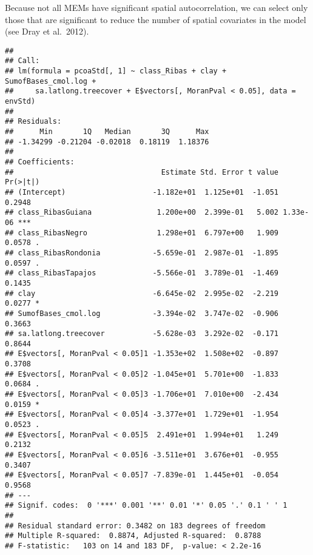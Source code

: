 \documentclass[]{article}
\newenvironment{Shaded}{\begin{snugshade}}{\end{snugshade}}
\newcommand{\CommentTok}[1]{\textcolor[rgb]{0.56,0.35,0.01}{\textit{#1}}}
\newcommand{\DataTypeTok}[1]{\textcolor[rgb]{0.13,0.29,0.53}{#1}}
\newcommand{\DecValTok}[1]{\textcolor[rgb]{0.00,0.00,0.81}{#1}}
\newcommand{\FloatTok}[1]{\textcolor[rgb]{0.00,0.00,0.81}{#1}}
\newcommand{\KeywordTok}[1]{\textcolor[rgb]{0.13,0.29,0.53}{\textbf{#1}}}
\newcommand{\NormalTok}[1]{#1}
\newcommand{\OperatorTok}[1]{\textcolor[rgb]{0.81,0.36,0.00}{\textbf{#1}}}
\newcommand{\StringTok}[1]{\textcolor[rgb]{0.31,0.60,0.02}{#1}}
\begin{document}
Because not all MEMs have significant spatial autocorrelation, we can
select only those that are significant to reduce the number of spatial
covariates in the model (see Dray et al.~2012).

\begin{Shaded}
\end{Shaded}

\begin{verbatim}
## 
## Call:
## lm(formula = pcoaStd[, 1] ~ class_Ribas + clay + SumofBases_cmol.log + 
##     sa.latlong.treecover + E$vectors[, MoranPval < 0.05], data = envStd)
## 
## Residuals:
##      Min       1Q   Median       3Q      Max 
## -1.34299 -0.21204 -0.02018  0.18119  1.18376 
## 
## Coefficients:
##                                  Estimate Std. Error t value Pr(>|t|)    
## (Intercept)                    -1.182e+01  1.125e+01  -1.051   0.2948    
## class_RibasGuiana               1.200e+00  2.399e-01   5.002 1.33e-06 ***
## class_RibasNegro                1.298e+01  6.797e+00   1.909   0.0578 .  
## class_RibasRondonia            -5.659e-01  2.987e-01  -1.895   0.0597 .  
## class_RibasTapajos             -5.566e-01  3.789e-01  -1.469   0.1435    
## clay                           -6.645e-02  2.995e-02  -2.219   0.0277 *  
## SumofBases_cmol.log            -3.394e-02  3.747e-02  -0.906   0.3663    
## sa.latlong.treecover           -5.628e-03  3.292e-02  -0.171   0.8644    
## E$vectors[, MoranPval < 0.05]1 -1.353e+02  1.508e+02  -0.897   0.3708    
## E$vectors[, MoranPval < 0.05]2 -1.045e+01  5.701e+00  -1.833   0.0684 .  
## E$vectors[, MoranPval < 0.05]3 -1.706e+01  7.010e+00  -2.434   0.0159 *  
## E$vectors[, MoranPval < 0.05]4 -3.377e+01  1.729e+01  -1.954   0.0523 .  
## E$vectors[, MoranPval < 0.05]5  2.491e+01  1.994e+01   1.249   0.2132    
## E$vectors[, MoranPval < 0.05]6 -3.511e+01  3.676e+01  -0.955   0.3407    
## E$vectors[, MoranPval < 0.05]7 -7.839e-01  1.445e+01  -0.054   0.9568    
## ---
## Signif. codes:  0 '***' 0.001 '**' 0.01 '*' 0.05 '.' 0.1 ' ' 1
## 
## Residual standard error: 0.3482 on 183 degrees of freedom
## Multiple R-squared:  0.8874, Adjusted R-squared:  0.8788 
## F-statistic:   103 on 14 and 183 DF,  p-value: < 2.2e-16
\end{verbatim}
\end{document}
